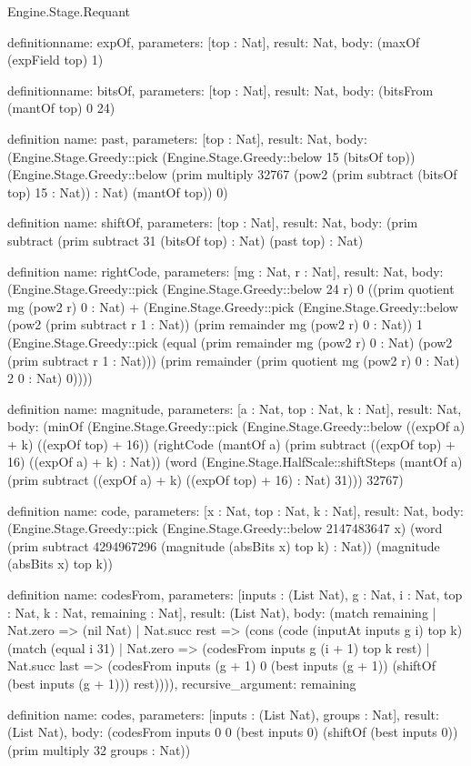 \begin{lexlean}{Engine.Stage.Requant}
\begin{semanticmodule}
definition{name: expOf, parameters: [top : Nat], result: Nat, body: (maxOf (expField top) 1)}

definition{name: bitsOf, parameters: [top : Nat], result: Nat, body: (bitsFrom (mantOf top) 0 24)}

definition{
  name: past,
  parameters: [top : Nat],
  result: Nat,
  body: (Engine.Stage.Greedy::pick (Engine.Stage.Greedy::below 15 (bitsOf top)) (Engine.Stage.Greedy::below (prim multiply 32767 (pow2 (prim subtract (bitsOf top) 15 : Nat)) : Nat) (mantOf top)) 0)
}

definition{
  name: shiftOf,
  parameters: [top : Nat],
  result: Nat,
  body: (prim subtract (prim subtract 31 (bitsOf top) : Nat) (past top) : Nat)
}

definition{
  name: rightCode,
  parameters: [mg : Nat, r : Nat],
  result: Nat,
  body: (Engine.Stage.Greedy::pick (Engine.Stage.Greedy::below 24 r) 0 ((prim quotient mg (pow2 r) 0 : Nat) + (Engine.Stage.Greedy::pick (Engine.Stage.Greedy::below (pow2 (prim subtract r 1 : Nat)) (prim remainder mg (pow2 r) 0 : Nat)) 1 (Engine.Stage.Greedy::pick (equal (prim remainder mg (pow2 r) 0 : Nat) (pow2 (prim subtract r 1 : Nat))) (prim remainder (prim quotient mg (pow2 r) 0 : Nat) 2 0 : Nat) 0))))
}

definition{
  name: magnitude,
  parameters: [a : Nat, top : Nat, k : Nat],
  result: Nat,
  body: (minOf (Engine.Stage.Greedy::pick (Engine.Stage.Greedy::below ((expOf a) + k) ((expOf top) + 16)) (rightCode (mantOf a) (prim subtract ((expOf top) + 16) ((expOf a) + k) : Nat)) (word (Engine.Stage.HalfScale::shiftSteps (mantOf a) (prim subtract ((expOf a) + k) ((expOf top) + 16) : Nat) 31))) 32767)
}

definition{
  name: code,
  parameters: [x : Nat, top : Nat, k : Nat],
  result: Nat,
  body: (Engine.Stage.Greedy::pick (Engine.Stage.Greedy::below 2147483647 x) (word (prim subtract 4294967296 (magnitude (absBits x) top k) : Nat)) (magnitude (absBits x) top k))
}

definition{
  name: codesFrom,
  parameters: [inputs : (List Nat), g : Nat, i : Nat, top : Nat, k : Nat, remaining : Nat],
  result: (List Nat),
  body: (match remaining
    | Nat.zero => (nil Nat)
    | Nat.succ rest => (cons (code (inputAt inputs g i) top k) (match (equal i 31)
      | Nat.zero => (codesFrom inputs g (i + 1) top k rest)
      | Nat.succ last => (codesFrom inputs (g + 1) 0 (best inputs (g + 1)) (shiftOf (best inputs (g + 1))) rest)))),
  recursive_argument: remaining
}

definition{
  name: codes,
  parameters: [inputs : (List Nat), groups : Nat],
  result: (List Nat),
  body: (codesFrom inputs 0 0 (best inputs 0) (shiftOf (best inputs 0)) (prim multiply 32 groups : Nat))
}


\end{semanticmodule}
\end{lexlean}
